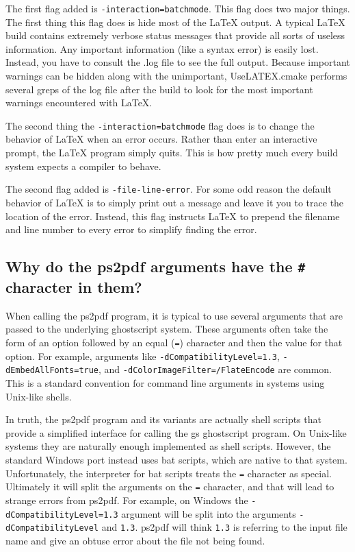 \documentclass{article}
\newcommand*{\textfile}[1]{\textsf{#1}}
\newcommand*{\textprog}[1]{\textfile{#1}}
\newcommand*{\textcmake}[1]{\texttt{#1}}
\newcommand*{\UseLATEX}{\textfile{UseLATEX.cmake}\xspace}
\newcommand*{\latex}{\LaTeX\xspace}
\begin{document}
  The first flag added is \mbox{\textcmake{-interaction=batchmode}}.
  This flag does two major things.
  The first thing this flag does is hide most of the \latex output.
  A typical \latex build contains extremely verbose status messages that provide all sorts of useless information.
  Any important information (like a syntax error) is easily lost.
  Instead, you have to consult the \textfile{.log} file to see the full output.
  Because important warnings can be hidden along with the unimportant, \UseLATEX performs several greps of the log file after the build to look for the most important warnings encountered with \latex.

  The second thing the \mbox{\textcmake{-interaction=batchmode}} flag does is to change the behavior of \latex when an error occurs.
  Rather than enter an interactive prompt, the \latex program simply quits.
  This is how pretty much every build system expects a compiler to behave.

  The second flag added is \mbox{\textcmake{-file-line-error}}.
  For some odd reason the default behavior of \latex is to simply print out a message and leave it you to trace the location of the error.
  Instead, this flag instructs \latex to prepend the filename and line number to every error to simplify finding the error.

  \subsection{Why do the \textprog{ps2pdf} arguments have the \textcmake{\#} character in them?}
  \label{sec:Why_do_the_ps2pdf_arguments_have_the_hash_character_in_them}

  When calling the \textprog{ps2pdf} program, it is typical to use several arguments that are passed to the underlying ghostscript system.
  These arguments often take the form of an option followed by an equal (\textcmake{=}) character and then the value for that option.
  For example, arguments like \mbox{\textcmake{-dCompatibilityLevel=1.3}}, \mbox{\textcmake{-dEmbedAllFonts=true}}, and \mbox{\textcmake{-dColorImageFilter=/FlateEncode}} are common.
  This is a standard convention for command line arguments in systems using Unix-like shells.

  In truth, the \textprog{ps2pdf} program and its variants are actually shell scripts that provide a simplified interface for calling the \textprog{gs} ghostscript program.
  On Unix-like systems they are naturally enough implemented as shell scripts.
  However, the standard Windows port instead uses \textprog{bat} scripts, which are native to that system.
  Unfortunately, the interpreter for \textprog{bat} scripts treats the \textcmake{=} character as special.
  Ultimately it will split the arguments on the \textcmake{=} character, and that will lead to strange errors from \textprog{ps2pdf}.
  For example, on Windows the \mbox{\textcmake{-dCompatibilityLevel=1.3}} argument will be split into the arguments \mbox{\textcmake{-dCompatibilityLevel}} and \mbox{\textcmake{1.3}}.
  \textprog{ps2pdf} will think \mbox{\textcmake{1.3}} is referring to the input file name and give an obtuse error about the file not being found.
\end{document}
